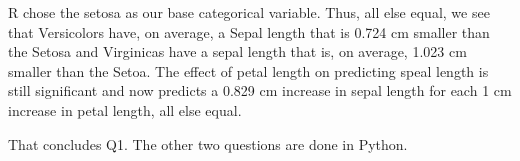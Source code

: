 \documentclass[
]{article}
\begin{document}
R chose the setosa as our base categorical variable. Thus, all else
equal, we see that Versicolors have, on average, a Sepal length that is
0.724 cm smaller than the Setosa and Virginicas have a sepal length that
is, on average, 1.023 cm smaller than the Setoa. The effect of petal
length on predicting speal length is still significant and now predicts
a 0.829 cm increase in sepal length for each 1 cm increase in petal
length, all else equal.

That concludes Q1. The other two questions are done in Python.
\end{document}
